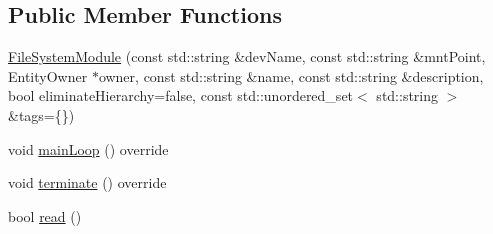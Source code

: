 \subsection*{Public Member Functions}
\begin{DoxyCompactItemize}
\item 
\hyperlink{structFileSystemModule_a84beb329e447f005f96332e366ce4658}{File\+System\+Module} (const std\+::string \&dev\+Name, const std\+::string \&mnt\+Point, Entity\+Owner $\ast$owner, const std\+::string \&name, const std\+::string \&description, bool eliminate\+Hierarchy=false, const std\+::unordered\+\_\+set$<$ std\+::string $>$ \&tags=\{\})
\item 
void \hyperlink{structFileSystemModule_a4199e1dd422368b3e3700d500f53666b}{main\+Loop} () override
\item 
void \hyperlink{structFileSystemModule_afb17665a1cecdec043f09e9ead389dd0}{terminate} () override
\item 
bool \hyperlink{structFileSystemModule_a67434494675af85aa26dee1671de0dd5}{read} ()
\end{DoxyCompactItemize}
